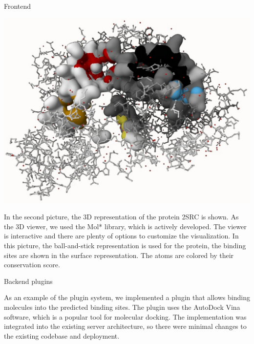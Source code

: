 \documentclass[portrait,a0paper,fontscale=0.25]{baposter}
\begin{document}
\begin{poster}
\begin{posterbox}[column=1, name=result1]{Frontend}
\begin{center}
	\includegraphics[width=0.8\linewidth]{img/molstar.pdf}
\end{center}

In the second picture, the 3D representation of the protein 2SRC is shown.
As the 3D viewer, we used the Mol* library, which is actively developed.
The viewer is interactive and there are plenty of options to customize the visualization.
In this picture, the ball-and-stick representation is used for the protein, the binding sites are shown in the surface representation.
The atoms are colored by their conservation score.

\end{posterbox}

\begin{posterbox}[column=1, name=result2, below=result1,
headerColorOne=violet!90!blue!60, boxColorOne=violet!15]{Backend plugins}

As an example of the plugin system, we implemented a plugin that allows binding molecules into the predicted binding sites.
The plugin uses the AutoDock Vina software, which is a popular tool for molecular docking.
The implementation was integrated into the existing server architecture, so there were minimal changes to the existing codebase and deployment.

\end{posterbox}


\end{poster}
\end{document}
